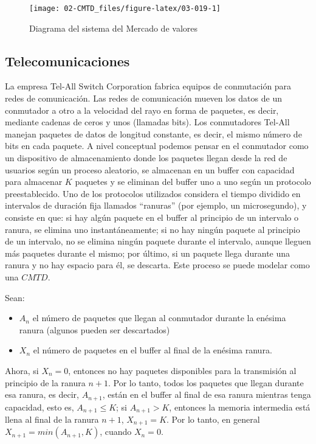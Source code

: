 \documentclass[
]{book}
\providecommand{\tightlist}{%
  \setlength{\itemsep}{0pt}\setlength{\parskip}{0pt}}
\theoremstyle{definition}
\theoremstyle{definition}
\theoremstyle{definition}
\theoremstyle{definition}
\theoremstyle{remark}
\begin{document}
\begin{figure}

{\centering \texttt{[image: 02-CMTD\_files/figure-latex/03-019-1]} 

}

\caption{Diagrama del sistema del Mercado de valores}\label{fig:03-019}
\end{figure}

\hypertarget{telecomunicaciones}{%
\subsection{Telecomunicaciones}\label{telecomunicaciones}}

La empresa Tel-All Switch Corporation fabrica equipos de conmutación para redes de comunicación. Las redes de comunicación mueven los datos de un conmutador a otro a la velocidad del rayo en forma de paquetes, es decir, mediante cadenas de ceros y unos (llamadas bits). Los conmutadores Tel-All manejan paquetes de datos de longitud constante, es decir, el mismo número de bits en cada paquete. A nivel conceptual podemos pensar en el conmutador como un dispositivo de almacenamiento donde los paquetes llegan desde la red de usuarios según un proceso aleatorio, se almacenan en un buffer con capacidad para almacenar \(K\) paquetes y se eliminan del buffer uno a uno según un protocolo preestablecido. Uno de los protocolos utilizados considera el tiempo dividido en intervalos de duración fija llamados ``ranuras'' (por ejemplo, un microsegundo), y consiste en que: si hay algún paquete en el buffer al principio de un intervalo o ranura, se elimina uno instantáneamente; si no hay ningún paquete al principio de un intervalo, no se elimina ningún paquete durante el intervalo, aunque lleguen más paquetes durante el mismo; por último, si un paquete llega durante una ranura y no hay espacio para él, se descarta. Este proceso se puede modelar como una \(CMTD\).

Sean:

\begin{itemize}
\tightlist
\item
  \(A_n\) el número de paquetes que llegan al conmutador durante la enésima ranura (algunos pueden ser descartados)
\item
  \(X_n\) el número de paquetes en el buffer al final de la enésima ranura.
\end{itemize}

Ahora, si \(X_n = 0\), entonces no hay paquetes disponibles para la transmisión al principio de la ranura \(n+1\). Por lo tanto, todos los paquetes que llegan durante esa ranura, es decir, \(A_{n+1}\), están en el buffer al final de esa ranura mientras tenga capacidad, esto es, \(A_{n+1} \leq K\); si \(A_{n+1}>K\), entonces la memoria intermedia está llena al final de la ranura \(n+1\), \(X_{n+1}=K\). Por lo tanto, en general \(X_{n+1} = min(A_{n+1}, K)\), cuando \(X_n=0\).
\end{document}
